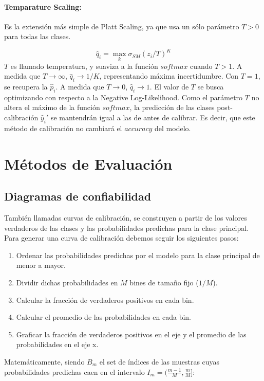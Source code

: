 \paragraph{Temparature Scaling:}

Es la extensión más simple de Platt Scaling, ya que usa un sólo parámetro $T>0$
para todas las clases. 

$$\displaystyle \hat q_{i}=\max_k \sigma_{SM}(z_i/T)^{K}$$ $T$ es llamado
temperatura, y suaviza a la función $softmax$ cuando $T>1$. A medida que
$T\to\infty$, $\hat q_{i}\to 1/K$, representando máxima incertidumbre. Con
$T=1$, se recupera la $\hat p_i$. A medida que $T \to 0$, $\hat q_{i} \to 1$. El
valor de $T$ se busca optimizando con respecto a la Negative Log-Likelihood.
Como el parámetro $T$ no altera el máximo de la función $softmax$, la predicción
de las clases post-calibración $\hat y_i '$ se mantendrán igual a las de antes
de calibrar. Es decir, que este método de calibración no cambiará el $accuracy$
del modelo.

\section{Métodos de Evaluación}

\subsection{Diagramas de confiabilidad}

También llamadas curvas de calibración, se construyen a partir de los valores
verdaderos de las clases y las probabilidades predichas para la clase principal.
Para generar una curva de calibración debemos seguir los siguientes pasos:

\begin{enumerate}
    \item Ordenar las probabilidades predichas por el modelo para la clase
    principal de menor a mayor.
    \item Dividir dichas probabilidades en $M$ bines de tamaño fijo ($1/M$).
    \item Calcular la fracción de verdaderos positivos en cada bin.
    \item Calcular el promedio de las probabilidades en cada bin.
    \item Graficar la fracción de verdaderos positivos en el eje y el promedio
    de las probabilidades en el eje x.    
\end{enumerate}

Matemáticamente, siendo $B_m$ el set de índices de las muestras cuyas
probabilidades predichas caen en el intervalo $I_m=(\frac{m-1}{M},
\frac{m}{M}]$:


